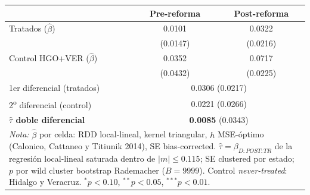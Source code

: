 \begin{tabular}{lcc}
\toprule
 & Pre-reforma & Post-reforma \\
\midrule
Tratados ($\hat{\beta}$)        & 0.0101 & 0.0322 \\
                                  & (0.0147) & (0.0216) \\
Control HGO+VER ($\hat{\beta}$) & 0.0352 & 0.0717 \\
                                  & (0.0432) & (0.0225) \\
\midrule
1er diferencial (tratados)        & \multicolumn{2}{c}{0.0306 \;(0.0217)} \\
2\textsuperscript{o} diferencial (control) & \multicolumn{2}{c}{0.0221 \;(0.0266)} \\
\textbf{$\hat{\tau}$ doble diferencial}   & \multicolumn{2}{c}{\textbf{0.0085} \;(0.0343)} \\
\bottomrule
\multicolumn{3}{p{0.85\textwidth}}{\footnotesize \textit{Nota:} $\hat{\beta}$ por celda:
  RDD local-lineal, kernel triangular, $h$ MSE-óptimo (Calonico, Cattaneo y Titiunik 2014),
  SE bias-corrected. $\hat{\tau}=\beta_{D:POST:TR}$ de la regresión local-lineal saturada
  dentro de $|m|\le 0.115$; SE clustered por estado; $p$ por wild cluster bootstrap
  Rademacher ($B=9999$). Control \textit{never-treated}: Hidalgo y Veracruz.
  $^{*}p<0.10$, $^{**}p<0.05$, $^{***}p<0.01$.}
\end{tabular}
